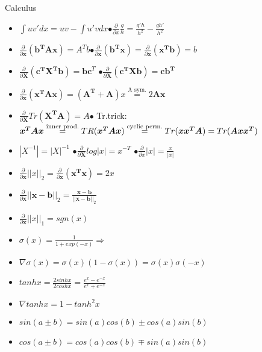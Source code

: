 Calculus
\begin{itemize}
    \item $\int uv'dx = uv - \int u'vdx$\hspace{0.3cm}$ \bullet\frac{\partial}{\partial x}\frac{g}{h} = \frac{g'h}{h^2} - \frac{gh'}{h^2}$
    \item $\frac{\partial}{\partial\boldsymbol{ x}}(\boldsymbol{b^TAx})=A^Tb$\hspace{0.3cm}$\bullet \frac{\partial}{\partial\boldsymbol{ x}}(\boldsymbol{b^Tx}) = \frac{\partial}{\partial\boldsymbol{ x}}(\boldsymbol{x^Tb}) = b$
    \item $\frac{\partial}{\partial\boldsymbol{ X}}(\boldsymbol{c^TX^Tb}) = \boldsymbol{bc}^T$ \hspace{0.3cm} $\bullet\frac{\partial}{\partial\boldsymbol{ X}}(\boldsymbol{c^TXb}) = \boldsymbol{cb^T}$
    \item $\frac{\partial}{\partial\boldsymbol{ x}}(\boldsymbol{x^TAx})=(\boldsymbol{A^T +A})x \overset{\text{A sym.}}{=} 2\boldsymbol{Ax}$
    \item $\frac{\partial}{\partial\boldsymbol{ X}}Tr(\boldsymbol{X^TA}) = A$\hspace{0.3cm}$\bullet$ Tr.trick: $\boldsymbol{x^TAx} \overset{\text{inner prod.}}{=}\\
    TR(\boldsymbol{x^TAx}) \overset{\text{cyclic perm.}}{=} Tr(\boldsymbol{xx^TA}) = Tr(\boldsymbol{Axx^T})$
    \item $|X^{-1}|=|X|^{-1}$ \hspace{0.02cm} $\bullet \frac{\partial}{\partial\boldsymbol{ X}}log|x|=x^{-T}$ \hspace{0.02cm} $\bullet \frac{\partial}{\partial x}|x| = \frac{x}{|x|}$
    \item $\frac{\partial}{\partial\boldsymbol{ x}}||x||_2 = \frac{\partial}{\partial\boldsymbol{ x}}(\boldsymbol{x^Tx}) = 2x$
    \item $\frac{\partial}{\partial\boldsymbol{ x}}||\boldsymbol{x-b}||_2 = \frac{\boldsymbol{x-b}}{||\boldsymbol{x-b}||_2}$
    \item $\frac{\partial}{\partial\boldsymbol{ x}} ||x||_1 = sgn(x)$
    \item $\sigma(x) = \frac{1}{1 + exp(-x)} \Rightarrow $
    \item $\nabla \sigma(x) = \sigma(x)(1-\sigma(x)) = \sigma(x)\sigma(-x)$
    \item $tanhx = \frac{2sinhx}{2coshx} = \frac{e^x - e^{-x}}{e^x + e^{-x}}$
    \item $\nabla tanhx = 1 - tanh^2x$
    \item $sin(a\pm b) = sin(a)cos(b) \pm cos(a)sin(b)$
    \item $cos(a\pm b) = cos(a)cos(b) \mp sin(a)sin(b)$
\end{itemize}